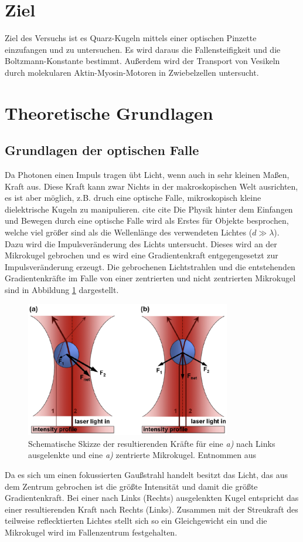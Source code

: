 \section{Ziel}
  Ziel des Versuchs ist es Quarz-Kugeln mittels einer optischen Pinzette einzufangen und zu untersuchen. Es wird daraus die Fallensteifigkeit und die Boltzmann-Konstante bestimmt. Außerdem wird der Transport von Vesikeln durch molekularen Aktin-Myosin-Motoren in Zwiebelzellen untersucht.
\section{Theoretische Grundlagen}
  \subsection{Grundlagen der optischen Falle}
    Da Photonen einen Impuls tragen übt Licht, wenn auch in sehr kleinen Maßen, Kraft aus. Diese Kraft kann zwar Nichts in der makroskopischen Welt ausrichten, es ist aber möglich, z.B. druch eine optische Falle, mikroskopisch kleine dielektrische Kugeln zu manipulieren. cite cite
    Die Physik hinter dem Einfangen und Bewegen durch eine optische Falle wird als Erstes für Objekte besprochen, welche viel größer sind als die Wellenlänge des verwendeten Lichtes ($d\gg\lambda$).
    Dazu wird die Impulsveränderung des Lichts untersucht. Dieses wird an der Mikrokugel gebrochen und es wird eine Gradientenkraft entgegengesetzt zur Impulsveränderung erzeugt. Die gebrochenen Lichtstrahlen und die entstehenden Gradientenkräfte im Falle von einer zentrierten und nicht zentrierten Mikrokugel sind in Abbildung \ref{fig:Falle} dargestellt.
    \begin{figure}[h]
      \centering
      \includegraphics[width = 0.8\textwidth]{pictures/Falle.png}
      \caption{Schematische Skizze der resultierenden Kräfte für eine \textit{a)} nach Links ausgelenkte und eine \textit{a)} zentrierte Mikrokugel. Entnommen aus \cite{tu_dortmund_versuchsanleitung_OptischePinzette}}
      \label{fig:Falle}
    \end{figure}
    Da es sich um einen fokussierten Gaußstrahl handelt besitzt das Licht, das aus dem Zentrum gebrochen ist die größte Intensität und damit die größte Gradientenkraft. Bei einer nach Links (Rechts) ausgelenkten Kugel entspricht das einer resultierenden Kraft nach Rechts (Links). Zusammen mit der Streukraft des teilweise reflecktierten Lichtes stellt sich so ein Gleichgewicht ein und die Mikrokugel wird im Fallenzentrum festgehalten.

